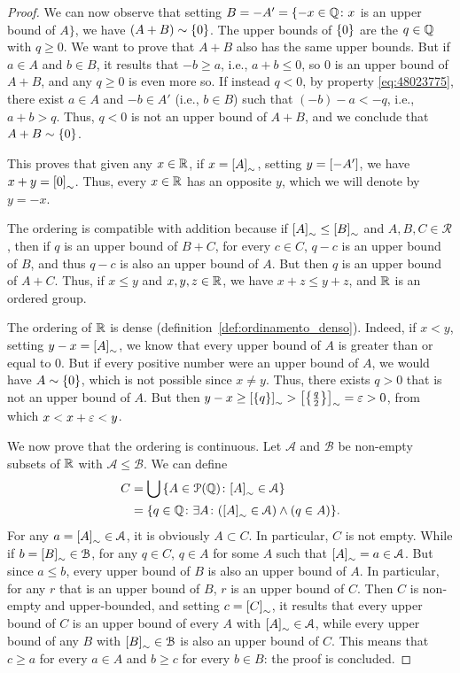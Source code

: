 \begin{proof}
    We can now observe that setting $B=-A' = \{-x\in {\mathbb Q} \colon x$ is an upper
  bound of $A\}$, we have $(A+B)\sim{\left\{ 0 \right\}}$. The upper bounds of
  ${\left\{ 0 \right\}}$ are the $q\in {\mathbb Q}$ with $q\ge 0$. We want to prove that $A+B$
  also has the same upper bounds. But if $a\in A$ and $b\in B$, it results that
  $-b\ge a$, i.e., $a+b\le 0$, so $0$ is an upper bound of $A+B$, and any $q\ge
  0$ is even more so. If instead $q<0$, by property \eqref{eq:48023775}, there
  exist $a\in A$ and $-b\in A'$ (i.e., $b\in B$) such that $(-b)-a<-q$, i.e.,
  $a+b>q$. Thus, $q<0$ is not an upper bound of $A+B$, and we conclude that
  $A+B\sim{\left\{ 0 \right\}}$.
  
    This proves that given any $x\in {\mathbb R}$, if $x={\left[ A \right]}_\sim$, setting
  $y={\left[ -A' \right]}$, we have $x+y={\left[ 0 \right]}_\sim$. Thus, every $x\in {\mathbb R}$ has
  an opposite $y$, which we will denote by $y=-x$.

    The ordering is compatible with addition because if ${\left[ A \right]}_\sim \le
  {\left[ B \right]}_\sim$ and $A,B,C\in \mathcal R$, then if $q$ is an upper bound of
  $B+C$, for every $c\in C$, $q-c$ is an upper bound of $B$, and thus $q-c$ is
  also an upper bound of $A$. But then $q$ is an upper bound of $A+C$. Thus, if
  $x\le y$ and $x,y,z\in {\mathbb R}$, we have $x+z\le y+z$, and ${\mathbb R}$ is an ordered
  group.
  
    The ordering of ${\mathbb R}$ is dense (definition~\ref{def:ordinamento_denso}).
  Indeed, if $x<y$, setting $y-x={\left[ A \right]}_\sim$, we know that every upper
  bound of $A$ is greater than or equal to $0$. But if every positive number
  were an upper bound of $A$, we would have $A\sim{\left\{ 0 \right\}}$, which is not
  possible since $x\neq y$. Thus, there exists $q>0$ that is not an upper bound
  of $A$. But then $y-x \ge {\left[ {\left\{ q \right\}} \right]}_\sim > {\left[ {\left\{ \frac
  q 2 \right\}} \right]}_\sim = \varepsilon > 0$, from which $x<x+\varepsilon<y$.
  
    We now prove that the ordering is continuous. Let $\mathcal A$ and $\mathcal
  B$ be non-empty subsets of ${\mathbb R}$ with $\mathcal A\le \mathcal B$. We can
  define
  \begin{align*}
        C & = \bigcup{\left\{ A\in \mathcal P({\mathbb Q})\colon {\left[ A \right]}_\sim \in
    \mathcal A \right\}} \\
      &= {\left\{ q\in {\mathbb Q}\colon \exists A\colon 
      ({\left[ A \right]}_\sim \in \mathcal A) \land (q\in A) \right\}}.
  \end{align*}
    For any $a={\left[ A \right]}_\sim \in \mathcal A$, it is obviously $A\subset C$.
  In particular, $C$ is not empty. While if $b={\left[ B \right]}_\sim \in \mathcal B$,
  for any $q\in C$, $q\in A$ for some $A$ such that ${\left[ A \right]}_\sim = a\in
  \mathcal A$. But since $a\le b$, every upper bound of $B$ is also an upper
  bound of $A$. In particular, for any $r$ that is an upper bound of $B$, $r$ is
  an upper bound of $C$. Then $C$ is non-empty and upper-bounded, and setting
  $c={\left[ C \right]}_\sim$, it results that every upper bound of $C$ is an upper
  bound of every $A$ with ${\left[ A \right]}_\sim \in \mathcal A$, while every upper
  bound of any $B$ with ${\left[ B \right]}_\sim\in \mathcal B$ is also an upper bound
  of $C$. This means that $c\ge a$ for every $a\in A$ and $b\ge c$ for every
  $b\in B$: the proof is concluded.
\end{proof}

